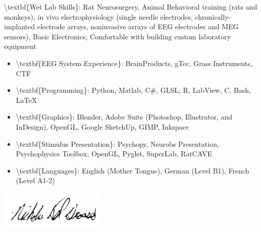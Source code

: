 \documentclass{article}
\begin{document}
\begin{cv}{}
\begin{itemize}
\textbackslash{}textbf\{Wet Lab Skills\}: Rat Neurosurgery, Animal Behavioral training (rats and monkeys), in vivo electrophysiology (single needle electrodes, chronically{-}implanted electrode arrays, noninvasive arrays of EEG electrodes and MEG sensors), Basic Electronics, Comfortable with building custom laboratory equipment
\end{itemize}
\begin{itemize}
\item
\textbackslash{}textbf\{EEG System Experience\}: BrainProducts, gTec, Grass Instruments, CTF
\end{itemize}
\begin{itemize}
\item
\textbackslash{}textbf\{Programming\}: Python, Matlab, C\#, GLSL, R, LabView, C, Bash, LaTeX
\end{itemize}
\begin{itemize}
\item
\textbackslash{}textbf\{Graphics\}: Blender, Adobe Suite (Photoshop, Illustrator, and InDesign), OpenGL, Google SketchUp, GIMP, Inkspace
\end{itemize}
\begin{itemize}
\item
\textbackslash{}textbf\{Stimulus Presentation\}: Psychopy, Neurobs Presentation, Psychophysics Toolbox, OpenGL, Pyglet, SuperLab, RatCAVE
\end{itemize}
\begin{itemize}
\item
\textbackslash{}textbf\{Languages\}: English (Mother Tongue), German (Level B1), French (Level A1{-}2)
\end{itemize}
\vspace{2em}
\vspace{2em}
\includegraphics[width=5cm]{images/Signaturetransparant.png}
\end{cv}
\end{document}
